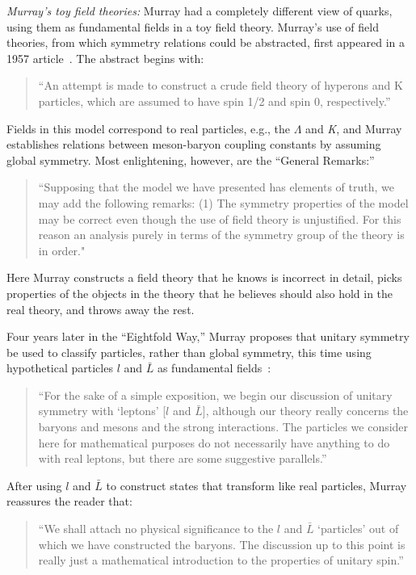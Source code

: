 \documentclass[12pt]{article}
\begin{document}
{\it Murray's toy field theories:}
Murray had a completely different view of quarks, using them as fundamental fields in a toy field theory. Murray's use of field theories, from which symmetry relations could be abstracted, first appeared in a 1957 article~\cite{MGMmodel}. The abstract begins with:
\begin{quote}
``An attempt is made to construct a crude field theory of hyperons and K particles, which are assumed to
have spin 1/2 and spin 0, respectively.''
\end{quote}
Fields in this model correspond to real particles, e.g., the $\Lambda$ and {\it K}, and Murray establishes relations between meson-baryon coupling constants by assuming global symmetry. Most enlightening, however, are the ``General Remarks:''
\begin{quote}
``Supposing that the model we have presented has elements of truth, we may add the following remarks:
\vskip 0.005in
(1) The symmetry properties of the model may be correct even though the use of field theory is unjustified. For this reason an analysis purely in terms of the symmetry group of the theory is in order."
\end{quote}
Here Murray constructs a field theory that he knows is incorrect in detail, picks properties of the objects in the theory that he believes should also hold in the real theory, and throws away the rest.

Four years later in the ``Eightfold Way,'' Murray proposes that unitary symmetry be used to classify particles, rather than global symmetry, this time using hypothetical particles $l$ and $\bar L$ as fundamental fields~\cite{MGMeight}:
\begin{quote}
``For the sake of a simple exposition, we begin our discussion of unitary symmetry with `leptons' [$l$ and $\bar L$], although our theory really concerns the baryons and mesons and the strong interactions. The particles we consider here for mathematical purposes do not necessarily have anything to do with real leptons, but there are some suggestive parallels.''
\end{quote}

After using $l$ and $\bar L$ to construct states that transform like real particles, Murray reassures the reader that:
\begin{quote}
``We shall attach no physical significance to the $l$ and $\bar L$ `particles' out of which we have constructed the baryons. The discussion up to this point is really just a mathematical introduction to the properties of unitary spin.''
\end{quote}
\end{document}
